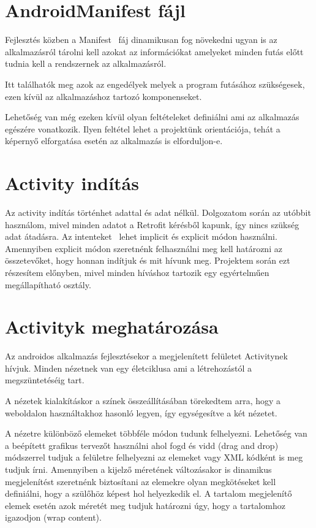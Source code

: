 \documentclass[
]{thesis-ekf}
\theoremstyle{definition}
\theoremstyle{remark}
\begin{document}
	\section{AndroidManifest fájl}
	Fejlesztés közben a Manifest~\cite{android_manifest} fáj dinamikusan fog növekedni ugyan is az alkalmazásról tárolni kell azokat az információkat amelyeket minden futás előtt tudnia kell a rendszernek az alkalmazásról.
	
	Itt találhatók meg azok az engedélyek melyek a program futásához szükségesek, ezen kívül az alkalmazáshoz tartozó komponenseket. 
	
	Lehetőség van még ezeken kívül olyan feltételeket definiálni ami az alkalmazás egészére vonatkozik. Ilyen feltétel lehet a projektünk orientációja, tehát a képernyő elforgatása esetén az alkalmazás is elforduljon-e.
	
	\section{Activity indítás}
	Az activity indítás történhet adattal és adat nélkül. Dolgozatom során az utóbbit használom, mivel minden adatot a Retrofit kérésből kapunk, így nincs szükség adat átadásra. Az intenteket~\cite{android_intent} lehet implicit és explicit módon használni. Amennyiben explicit módon szeretnénk felhasználni meg kell határozni az összetevőket, hogy honnan indítjuk és mit hívunk meg. Projektem során ezt részesítem előnyben, mivel minden híváshoz tartozik egy egyértelműen megállapítható osztály.
	
	\section{Activityk meghatározása}
	Az androidos alkalmazás fejlesztésekor a megjelenített felületet Activitynek hívjuk. Minden nézetnek van egy életciklusa ami a létrehozástól a megszüntetéséig tart.
	
	A nézetek kialakításkor a színek összeállításában törekedtem arra, hogy a weboldalon használtakhoz hasonló legyen, így egységesítve a két nézetet. 
	
	A nézetre különböző elemeket többféle módon tudunk felhelyezni. Lehetőség van a beépített grafikus tervezőt használni ahol fogd és vidd (drag and drop) módszerrel tudjuk a felületre felhelyezni az elemeket vagy XML kódként is meg tudjuk írni. Amennyiben a kijelző méretének változásakor is dinamikus megjelenítést szeretnénk biztosítani az elemekre olyan megkötéseket kell definiálni, hogy a szülőhöz képest hol helyezkedik el. A tartalom megjelenítő elemek esetén azok méretét meg tudjuk határozni úgy, hogy a tartalomhoz igazodjon (wrap content).
	
\end{document}
